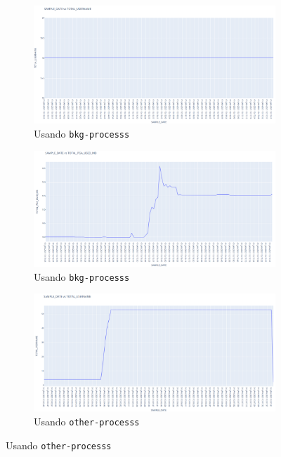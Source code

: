 \documentclass{article}
\begin{document}
\begin{figure}[ht!]
  \begin{subfigure}{0.5\textwidth}
    \centering  
    \includegraphics[width=0.9\linewidth]{t06-grafica01-bkg}
    \caption{Usando \texttt{bkg-processs}}
  \end{subfigure} 
  \begin{subfigure}{0.5\textwidth}
    \centering  
    \includegraphics[width=0.9\linewidth]{t06-grafica02-bkg}
    \caption{Usando \texttt{bkg-processs}}
  \end{subfigure} 
  \newline 
  \begin{subfigure}{0.5\textwidth}
    \centering  
    \includegraphics[width=0.9\linewidth]{t06-grafica01-other}
    \caption{Usando \texttt{other-processs}}
  \end{subfigure} 

\end{figure}
\end{document}
